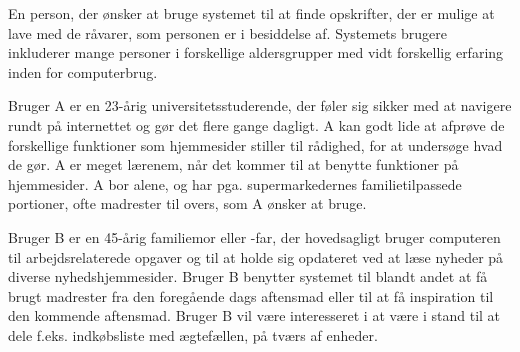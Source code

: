 {En person, der ønsker at bruge systemet \Foodl{} til at finde opskrifter, der er mulige at lave med de råvarer, som personen er i besiddelse af.}
{Systemets brugere inkluderer mange personer i forskellige aldersgrupper med vidt forskellig erfaring inden for computerbrug.}
{Bruger A er en 23-årig universitetsstuderende, der føler sig sikker med at navigere rundt på internettet og gør det flere gange dagligt. A kan godt lide at afprøve de forskellige funktioner som hjemmesider stiller til rådighed, for at undersøge hvad de gør. A er meget lærenem, når det kommer til at benytte funktioner på hjemmesider. A bor alene, og har pga. supermarkedernes familietilpassede portioner, ofte madrester til overs, som A ønsker at bruge. 

Bruger B er en 45-årig familiemor eller -far, der hovedsagligt bruger computeren til arbejdsrelaterede opgaver og til at holde sig opdateret ved at læse nyheder på diverse nyhedshjemmesider. Bruger B benytter systemet til blandt andet at få brugt madrester fra den foregående dags aftensmad eller til at få inspiration til den kommende aftensmad. Bruger B vil være interesseret i at være i stand til at dele f.eks. indkøbsliste med ægtefællen, på tværs af enheder.}
{}
